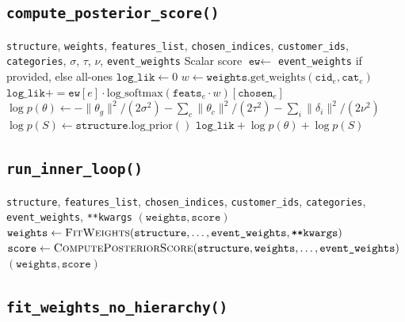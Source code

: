 \documentclass[11pt,a4paper]{article}
\begin{document}
\subsection{\texttt{compute\_posterior\_score()}}

\begin{algorithm}[H]
\caption{\textsc{ComputePosteriorScore}}\label{alg:posterior-score}
\begin{algorithmic}[1]
\Require \texttt{structure}, \texttt{weights}, \texttt{features\_list}, \texttt{chosen\_indices}, \texttt{customer\_ids}, \texttt{categories}, $\sigma$, $\tau$, $\nu$, \texttt{event\_weights}
\Ensure Scalar score
\State $\texttt{ew} \gets$ \texttt{event\_weights} if provided, else all-ones
\State $\texttt{log\_lik} \gets 0$
    \State $w \gets \texttt{weights}.\text{get\_weights}(\texttt{cid}_e, \texttt{cat}_e)$
    \State $\texttt{log\_lik} \mathrel{{+}{=}} \texttt{ew}[e] \cdot \text{log\_softmax}(\texttt{feats}_e \cdot w)[\texttt{chosen}_e]$
\EndFor
\State $\log p(\theta) \gets -\|\theta_g\|^2 / (2\sigma^2) - \sum_c \|\theta_c\|^2 / (2\tau^2) - \sum_i \|\delta_i\|^2 / (2\nu^2)$
\State $\log p(S) \gets \texttt{structure}.\text{log\_prior}()$ 
\State \Return $\texttt{log\_lik} + \log p(\theta) + \log p(S)$
\end{algorithmic}
\end{algorithm}

\subsection{\texttt{run\_inner\_loop()}}

\begin{algorithm}[H]
\caption{\textsc{RunInnerLoop}}\label{alg:run-inner}
\begin{algorithmic}[1]
\Require \texttt{structure}, \texttt{features\_list}, \texttt{chosen\_indices}, \texttt{customer\_ids}, \texttt{categories}, \texttt{event\_weights}, \texttt{**kwargs}
\Ensure $(\texttt{weights}, \texttt{score})$
\State $\texttt{weights} \gets \Call{FitWeights}{\texttt{structure}, \ldots, \texttt{event\_weights}, \texttt{**kwargs}}$
\State $\texttt{score} \gets \Call{ComputePosteriorScore}{\texttt{structure}, \texttt{weights}, \ldots, \texttt{event\_weights}}$
\State \Return $(\texttt{weights}, \texttt{score})$
\end{algorithmic}
\end{algorithm}


\subsection{\texttt{fit\_weights\_no\_hierarchy()}}
\end{document}
